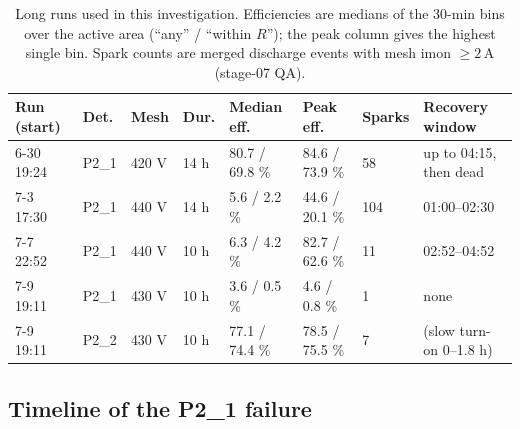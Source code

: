 \documentclass[11pt,a4paper]{article}
\newcommand{\detone}{P2\_1}
\newcommand{\dettwo}{P2\_2}
\newcommand{\uA}{\,\textmu A}
\begin{document}
\begin{table}[H]
  \centering\small
  \caption{Long runs used in this investigation. Efficiencies are medians of
  the 30-min bins over the active area (``any'' / ``within $R$'');
  the peak column gives the highest single bin. Spark counts are merged
  discharge events with mesh imon $\geq 2$\uA{} (stage-07 QA).}
  \label{tab:runs}
  \begin{tabular}{llllllll}
    \toprule
    Run (start) & Det. & Mesh & Dur. & Median eff. & Peak eff. & Sparks &
    Recovery window \\
    \midrule
    6-30 19:24 & \detone & 420 V & 14 h & 80.7 / 69.8 \% & 84.6 / 73.9 \% & 58 &
    up to 04:15, then dead \\
    7-3 17:30 & \detone & 440 V & 14 h & 5.6 / 2.2 \% & 44.6 / 20.1 \% & 104 &
    01:00--02:30 \\
    7-7 22:52 & \detone & 440 V & 10 h & 6.3 / 4.2 \% & 82.7 / 62.6 \% & 11 &
    02:52--04:52 \\
    7-9 19:11 & \detone & 430 V & 10 h & 3.6 / 0.5 \% & 4.6 / 0.8 \% & 1 &
    none \\
    7-9 19:11 & \dettwo & 430 V & 10 h & 77.1 / 74.4 \% & 78.5 / 75.5 \% & 7 &
    (slow turn-on 0--1.8 h) \\
    \bottomrule
  \end{tabular}
\end{table}

\subsection{Timeline of the \detone{} failure}
\label{sec:timeline}
\end{document}
